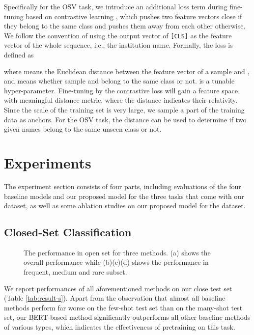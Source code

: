 \documentclass{article}
\begin{document}
Specifically for the OSV task, we introduce an additional loss term during fine-tuning based on contrastive learning \cite{hadsell2006dimensionality}, which pushes two feature vectors close if they belong to the same class and pushes them away from each other otherwise. We follow the convention of using the output vector of \texttt{[CLS]} as the feature vector of the whole sequence, i.e., the institution name. Formally, the loss is defined as



where  means the Euclidean distance between the feature vector of a sample  and , and  means whether sample  and  belong to the same class or not.  is a tunable hyper-parameter. Fine-tuning by the contrastive loss will gain a feature space with meaningful distance metric, where the distance indicates their relativity. 
Since the scale of the training set is very large, we sample a part of the training data as anchors. For the OSV task, the distance can be used to determine if two given names belong to the same unseen class or not. 

\section{Experiments}
The experiment section consists of four parts, including evaluations of the four baseline models and our proposed model for the three tasks that come with our dataset, as well as some ablation studies on our proposed model for the dataset. 
\subsection{Closed-Set Classification}

\begin{figure*} [ht]
	\centering 
	\centering
	\caption{ The performance in open set for three methods. (a) shows the overall performance while (b)(c)(d) shows the performance in frequent, medium and rare subset.} 
	\label{fig:osc_result} 
\end{figure*} 


We report performances of all aforementioned methods on our close test set (Table \ref{tab:result-s}). 
Apart from the observation that almost all baseline methods perform far worse on the few-shot test set than on the many-shot test set, our BERT-based method significantly outperforms all other baseline methods of various types, which indicates the effectiveness of pretraining on this task.
\end{document}
